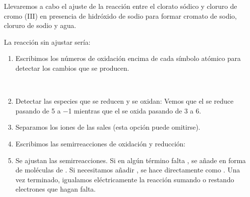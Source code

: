 Llevaremos a cabo el ajuste de la reacción entre el clorato sódico y cloruro de cromo (III) en presencia de hidróxido de sodio para formar cromato de sodio, cloruro de sodio y agua.

La reacción sin ajustar sería:

\begin{centeredequation}
\end{centeredequation}


\begin{enumerate}[label=\numberballmDarkTeal]
        \item Escribimos los números de oxidación encima de cada símbolo atómico para detectar los cambios que se producen.
        \begin{centeredequation}
            \ \ \ch{+} \ \ \ \ch{+} \ \ \ \ch{->} \ \ \ \ch{+} \ \ \ch{+} \ 
        \end{centeredequation}
        \item Detectar las especies que se reducen y se oxidan: Vemos que el  se reduce pasando de \num{+5} a \num{-1} mientras que el  se oxida pasando de \num{+3} a \num[retain-explicit-plus]{+6}.
        \item Separamos los iones de las sales (esta opción puede omitirse).
        \begin{centeredequation}
        \end{centeredequation}
        \item Escribimos las semirreacciones de oxidación y reducción:
        \begin{centeredequation}
            \qquad {}
        \end{centeredequation}
        \begin{centeredequation}
            \qquad {}
        \end{centeredequation}
        \item Se ajustan las semirreacciones.
        Si en algún término falta , se añade en forma de moléculas de \water.
        Si necesitamos añadir , se hace directamente como .
        Una vez terminado, igualamos eléctricamente la reacción sumando o restando electrones que hagan falta.

\end{enumerate}
